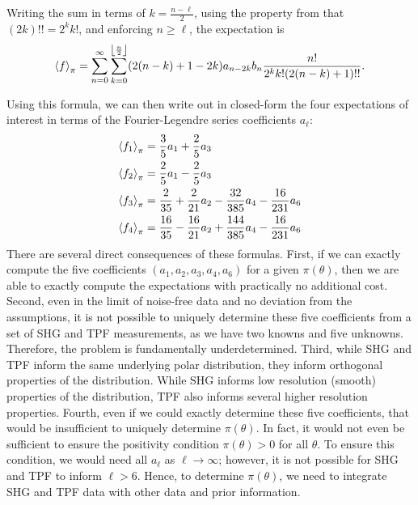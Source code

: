 \documentclass[../../main.tex]{subfiles}
\begin{document}
\begin{refsection}
	Writing the sum in terms of $k = \frac{n - \ell}{2}$, using the property from \cite[Eq. 8.33c]{arfkenMathematicalMethodsPhysicists2005} that $(2k)!! = 2^k k!$, and enforcing $n \ge \ell$, the expectation is
	$$\left\langle f \right\rangle_{\pi} = \sum_{n = 0}^\infty \sum_{k = 0}^{\left\lfloor\frac{n}{2}\right\rfloor} (2(n - k) + 1 - 2k) a_{n - 2k} b_n \frac{n!}{2^k k! (2(n - k) + 1)!!}.$$

	Using this formula, we can then write out in closed-form the four expectations of interest in terms of the Fourier-Legendre series coefficients $a_\ell$:
	\begin{align*}
		\left\langle f_1 \right\rangle_{\pi} & = \frac{3}{5} a_1 + \frac{2}{5} a_3                                            \\
		\left\langle f_2 \right\rangle_{\pi} & = \frac{2}{5} a_1 - \frac{2}{5} a_3                                            \\
		\left\langle f_3 \right\rangle_{\pi} & = \frac{2}{35} + \frac{2}{21} a_2 - \frac{32}{385} a_4 - \frac{16}{231} a_6    \\
		\left\langle f_4 \right\rangle_{\pi} & = \frac{16}{35} - \frac{16}{21} a_2 + \frac{144}{385} a_4 - \frac{16}{231} a_6
	\end{align*}
	There are several direct consequences of these formulas.
	First, if we can exactly compute the five coefficients $(a_1,a_2,a_3,a_4,a_6)$ for a given $\pi(\theta)$, then we are able to exactly compute the expectations with practically no additional cost.
	Second, even in the limit of noise-free data and no deviation from the assumptions, it is not possible to uniquely determine these five coefficients from a set of SHG and TPF measurements, as we have two knowns and five unknowns.
	Therefore, the problem is fundamentally underdetermined.
	Third, while SHG and TPF inform the same underlying polar distribution, they inform orthogonal properties of the distribution.
	While SHG informs low resolution (\ie smooth) properties of the distribution, TPF also informs several higher resolution properties.
	Fourth, even if we could exactly determine these five coefficients, that would be insufficient to uniquely determine $\pi(\theta)$.
	In fact, it would not even be sufficient to ensure the positivity condition $\pi(\theta) > 0$ for all $\theta$.
	To ensure this condition, we would need all $a_\ell$ as $\ell \to \infty$;
	however, it is not possible for SHG and TPF to inform $\ell > 6$.
	Hence, to determine $\pi(\theta)$, we need to integrate SHG and TPF data with other data and prior information.



\end{refsection}
\end{document}
